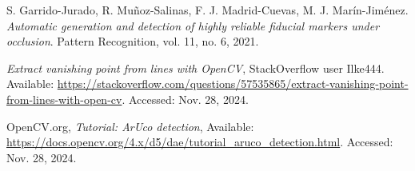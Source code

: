 \documentclass[a4paper,twocolumn]{article}
\begin{document}

\begin{thebibliography}{9}

    S. Garrido-Jurado, R. Muñoz-Salinas, F. J. Madrid-Cuevas, M. J. Marín-Jiménez. 
    \textit{Automatic generation and detection of highly reliable fiducial markers under occlusion}. 
    Pattern Recognition, vol. 11, no. 6, 2021.
    
    \textit{Extract vanishing point from lines with OpenCV}, 
    StackOverflow user Ilke444. Available: \url{https://stackoverflow.com/questions/57535865/extract-vanishing-point-from-lines-with-open-cv}. 
    Accessed: Nov. 28, 2024.

    OpenCV.org, 
    \textit{Tutorial: ArUco detection}, 
    Available: \url{https://docs.opencv.org/4.x/d5/dae/tutorial_aruco_detection.html}. 
    Accessed: Nov. 28, 2024.

\end{thebibliography}

\end{document}
